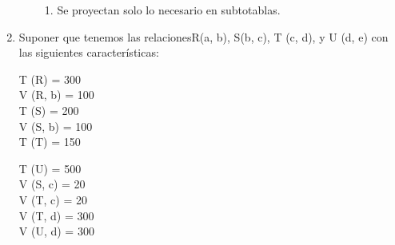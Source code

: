 \documentclass{templateNote}
\begin{document}
\begin{enumerate}
\begin{enumerate}[label=\alph*)]
\begin{enumerate}
            \item Se proyectan solo lo necesario en subtotablas.
            \begin{center}
            \end{center}

        \end{enumerate} 
    \end{enumerate}

    \newpage
    \item Suponer que tenemos las relacionesR(a, b), S(b, c), T (c, d), y U (d, e) con las siguientes características: \\
    
    \begin{minipage}{0.5\textwidth}
        T (R) = 300 \\
        V (R, b) = 100 \\
        T (S) = 200 \\
        V (S, b) = 100 \\
        T (T) = 150  
        \end{minipage}%
        \begin{minipage}{0.5\textwidth}
        T (U) = 500 \\
        V (S, c) = 20 \\
        V (T, c) = 20 \\
        V (T, d) = 300 \\
        V (U, d) = 300
    \end{minipage}


\end{enumerate}
\end{document}
